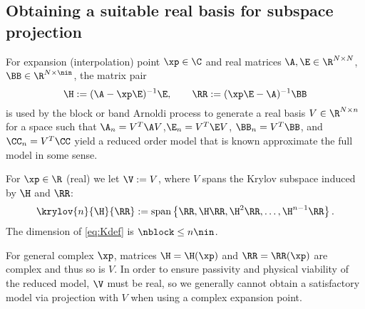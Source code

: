 
\subsection{Obtaining a suitable real basis for subspace projection}\label{sec:makingrealV}
For expansion (interpolation) point $\xp\in\C$ and real matrices $\A,\E\in\R^{N\times N}$,
$\BB\in\R^{N\times \nin}$,
the matrix pair
\begin{equation*}
			\H := (\A-\xp \E)^{-1}\E,\qquad \RR := (\xp \E - \A)^{-1}\BB	
\end{equation*}
is used by the block or band Arnoldi process to generate a real basis $V\in\R^{N\times n}$
for a space such that $\A_n=V^T\A  V$,$\E_n=V^T \E V$, $\BB_n=V^T \BB$, and $\CC_n=V^T \CC$ yield a reduced order model that is known approximate the full model in some sense.

For $\xp\in\R$ (real) we let $\V:=V$, where $V$ spans the Krylov subspace induced by $\H$
and $\RR$:
\begin{equation}
   	 \krylov{n}{\H}{\RR}:= \text{span} \left\{\RR, \H \RR, \H^2\RR,\ldots, \H^{n-1}\RR\right\}.
   	 \label{eq:Kdef}
\end{equation}
The dimension of \eqref{eq:Kdef} is $\nblock \leq n\nin$.

For general complex $\xp$, matrices $\H=\H(\xp)$ and $\RR=\RR(\xp)$ are
complex and thus so is $V$.  In order to
ensure passivity and physical viability of the reduced model, $\V$ must be real, so
we generally cannot obtain a satisfactory model via projection with $V$ when
using a complex expansion point.

